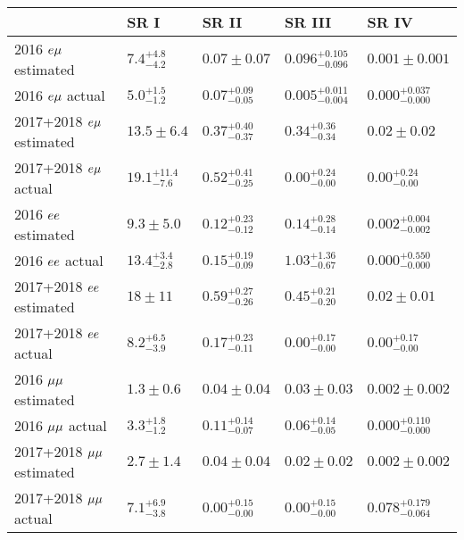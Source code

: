 \begin{table}
\renewcommand{\arraystretch}{1.3}
\noindent \centering{}
\label{sr_closure_tests}
\begin{tabular}{l|llll}
  & SR I & SR II & SR III & SR IV\\
\hline
2016 $e{\mu}$ estimated       & $7.4^{+4.8}_{-4.2}$    & $0.07\pm0.07$          & $0.096^{+0.105}_{-0.096}$ & $0.001\pm0.001$\\
2016 $e{\mu}$ actual          & $5.0^{+1.5}_{-1.2}$    & $0.07^{+0.09}_{-0.05}$ & $0.005^{+0.011}_{-0.004}$ & $0.000^{+0.037}_{-0.000}$\\
\hline
2017+2018 $e{\mu}$ estimated  & $13.5\pm6.4$           & $0.37^{+0.40}_{-0.37}$ & $0.34^{+0.36}_{-0.34}$    & $0.02\pm0.02$\\
2017+2018 $e{\mu}$ actual     & $19.1^{+11.4}_{-7.6}$  & $0.52^{+0.41}_{-0.25}$ & $0.00^{+0.24}_{-0.00}$    & $0.00^{+0.24}_{-0.00}$\\
\hline
2016 $ee$ estimated        & $9.3\pm5.0$            & $0.12^{+0.23}_{-0.12}$ & $0.14^{+0.28}_{-0.14}$    & $0.002^{+0.004}_{-0.002}$\\
2016 $ee$ actual           & $13.4^{+3.4}_{-2.8}$   & $0.15^{+0.19}_{-0.09}$ & $1.03^{+1.36}_{-0.67}$    & $0.000^{+0.550}_{-0.000}$\\
\hline
2017+2018 $ee$ estimated   & $18\pm11$              & $0.59^{+0.27}_{-0.26}$ & $0.45^{+0.21}_{-0.20}$    & $0.02\pm0.01$\\
2017+2018 $ee$ actual      & $8.2^{+6.5}_{-3.9}$    & $0.17^{+0.23}_{-0.11}$ & $0.00^{+0.17}_{-0.00}$    & $0.00^{+0.17}_{-0.00}$\\
\hline
2016 ${\mu}{\mu}$ estimated      & $1.3\pm0.6$            & $0.04\pm0.04$          & $0.03\pm0.03$             & $0.002\pm0.002$\\
2016 ${\mu}{\mu}$ actual         & $3.3^{+1.8}_{-1.2}$    & $0.11^{+0.14}_{-0.07}$ & $0.06^{+0.14}_{-0.05}$    & $0.000^{+0.110}_{-0.000}$\\
\hline
2017+2018 ${\mu}{\mu}$ estimated & $2.7\pm1.4$            & $0.04\pm0.04$          & $0.02\pm0.02$             & $0.002\pm0.002$\\
2017+2018 ${\mu}{\mu}$ actual    & $7.1^{+6.9}_{-3.8}$    & $0.00^{+0.15}_{-0.00}$ & $0.00^{+0.15}_{-0.00}$    & $0.078^{+0.179}_{-0.064}$\\
\hline
\end{tabular}
\end{table}
